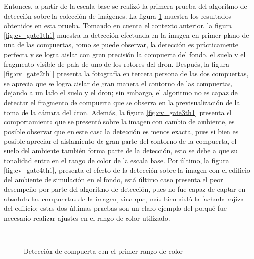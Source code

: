 Entonces, a partir de la escala base se realizó la primera prueba del algoritmo de detección sobre la colección de imágenes. La figura \ref{fig:cv_gatesth1} muestra los resultados obtenidos en esta prueba. Tomando en cuenta el contexto anterior, la figura \ref{fig:cv_gate1th1} muestra la detección efectuada en la imagen en primer plano de una de las compuertas, como se puede observar, la detección es prácticamente perfecta y se logra aislar con gran precisión la compuerta del fondo, el suelo y el fragmento visible de pala de uno de los rotores del dron. Después, la figura \ref{fig:cv_gate2th1} presenta la fotografía en tercera persona de las dos compuertas, se aprecia que se logra aislar de gran manera el contorno de las compuertas, dejando a un lado el suelo y el dron;  sin embargo, el algoritmo no es capaz de detectar el fragmento de compuerta que se observa en la previsualización de la toma de la cámara del dron. Además, la figura \ref{fig:cv_gate3th1} presenta el comportamiento que se presentó sobre la imagen con cambio de ambiente, es posible observar que en este caso la detección es menos exacta, pues si bien es posible apreciar el aislamiento de gran parte del contorno de la compuerta, el suelo del ambiente también forma parte de la detección, esto se debe a que su tonalidad entra en el rango de color de la escala base. Por último, la figura \ref{fig:cv_gate4th1}, presenta el efecto de la detección sobre la imagen con el edificio del ambiente de simulación en el fondo, está último caso presenta el peor desempeño por parte del algoritmo de detección, pues no fue capaz de captar en absoluto las compuertas de la imagen, sino que, más bien aisló la fachada rojiza del edificio; estas dos últimas pruebas son un claro ejemplo del porqué fue necesario realizar ajustes en el rango de color utilizado.


\begin{figure}[ht]
    \centering
    \hfill
    \\
    \hfill
    \hfill

    \caption{Detección de compuerta con el primer rango de color}
    \label{fig:cv_gatesth1}
\end{figure}

